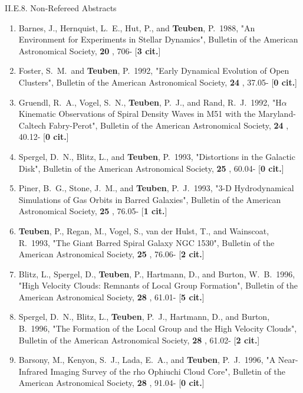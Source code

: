 \documentclass[11pt,letterpaper]{article}
\begin{document}




II.E.8. Non-Refereed Abstracts


\begin{enumerate}[resume,label=\textbf{\arabic*}.]

\item  
Barnes, J., Hernquist, L.~E., Hut, P., and {\bf Teuben}, P.\  1988,  "An 
Environment for Experiments in Stellar Dynamics", Bulletin of the American 
Astronomical Society,  {\bf 20} , 706- [{\bf 3 cit.}] 
\item  
Foster, S.~M.~and {\bf Teuben}, P.\  1992,  "Early Dynamical Evolution of Open 
Clusters", Bulletin of the American Astronomical Society,  {\bf 24} , 
37.05- [{\bf 0 cit.}] 
\item  
Gruendl, R.~A., Vogel, S.~N., {\bf Teuben}, P.~J., and Rand, R.~J.\  1992,  
"H{$\alpha$} Kinematic Observations of Spiral Density Waves in M51 with the 
Maryland-Caltech Fabry-Perot", Bulletin of the American Astronomical 
Society,  {\bf 24} , 40.12- [{\bf 0 cit.}] 
\item  
Spergel, D.~N., Blitz, L., and {\bf Teuben}, P.\  1993,  "Distortions in the 
Galactic Disk", Bulletin of the American Astronomical Society,  {\bf 25} , 
60.04- [{\bf 0 cit.}] 

\item  
Piner, B.~G., Stone, J.~M., and {\bf Teuben}, P.~J.\  1993,  "3-D Hydrodynamical 
Simulations of Gas Orbits in Barred Galaxies", Bulletin of the American 
Astronomical Society,  {\bf 25} , 76.05- [{\bf 1 cit.}] 
\item  
{\bf Teuben}, P., Regan, M., Vogel, S., van der Hulst, T., and Wainscoat, R.\  
1993,  "The Giant Barred Spiral Galaxy NGC 1530", Bulletin of the American 
Astronomical Society,  {\bf 25} , 76.06- [{\bf 2 cit.}] 
\item  
Blitz, L., Spergel, D., {\bf Teuben}, P., Hartmann, D., and Burton, W.~B.\  
1996,  "High Velocity Clouds: Remnants of Local Group Formation", Bulletin 
of the American Astronomical Society,  {\bf 28} , 61.01- [{\bf 5 cit.}] 

\item  
Spergel, D.~N., Blitz, L., {\bf Teuben}, P.~J., Hartmann, D., and Burton, B.\  
1996,  "The Formation of the Local Group and the High Velocity Clouds", 
Bulletin of the American Astronomical Society,  {\bf 28} , 61.02- [{\bf 2 
cit.}] 
\item  
Barsony, M., Kenyon, S.~J., Lada, E.~A., and {\bf Teuben}, P.~J.\  1996,  "A 
Near-Infrared Imaging Survey of the rho Ophiuchi Cloud Core", Bulletin of 
the American Astronomical Society,  {\bf 28} , 91.04- [{\bf 0 cit.}] 


\end{enumerate}
\end{document}
